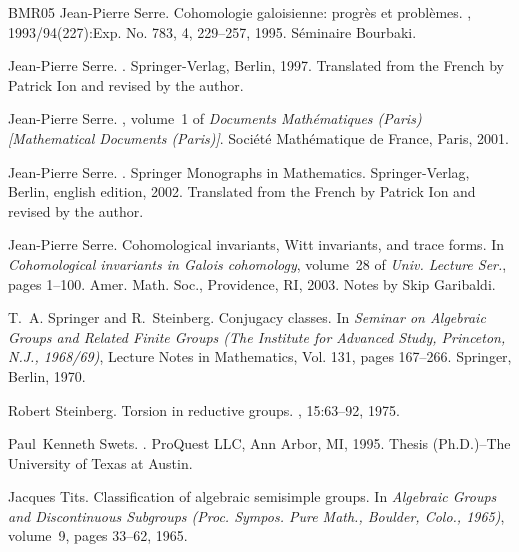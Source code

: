 \begin{thebibliography}{BMR05}
Jean-Pierre Serre.
\newblock Cohomologie galoisienne: progr\`es et probl\`emes.
, 1993/94(227):Exp. No. 783, 4, 229--257, 1995.
\newblock S\'{e}minaire Bourbaki.

Jean-Pierre Serre.
.
\newblock Springer-Verlag, Berlin, 1997.
\newblock Translated from the French by Patrick Ion and revised by the author.

Jean-Pierre Serre.
, volume~1 of {\em Documents Math\'{e}matiques (Paris) [Mathematical Documents (Paris)]}.
\newblock Soci{\'e}t{\'e} Math{\'e}matique de France, Paris, 2001.

Jean-Pierre Serre.
.
\newblock Springer Monographs in Mathematics. Springer-Verlag, Berlin, english edition, 2002.
\newblock Translated from the French by Patrick Ion and revised by the author.

Jean-Pierre Serre.
\newblock Cohomological invariants, {W}itt invariants, and trace forms.
\newblock In {\em Cohomological invariants in {G}alois cohomology}, volume~28 of {\em Univ. Lecture Ser.}, pages 1--100. Amer. Math. Soc., Providence, RI, 2003.
\newblock Notes by Skip Garibaldi.

T.~A. Springer and R.~Steinberg.
\newblock Conjugacy classes.
\newblock In {\em Seminar on {A}lgebraic {G}roups and {R}elated {F}inite {G}roups ({T}he {I}nstitute for {A}dvanced {S}tudy, {P}rinceton, {N}.{J}., 1968/69)}, Lecture Notes in Mathematics, Vol. 131, pages 167--266. Springer, Berlin, 1970.

Robert Steinberg.
\newblock Torsion in reductive groups.
, 15:63--92, 1975.

Paul~Kenneth Swets.
.
\newblock ProQuest LLC, Ann Arbor, MI, 1995.
\newblock Thesis (Ph.D.)--The University of Texas at Austin.

Jacques Tits.
\newblock Classification of algebraic semisimple groups.
\newblock In {\em Algebraic Groups and Discontinuous Subgroups (Proc. Sympos. Pure Math., Boulder, Colo., 1965)}, volume~9, pages 33--62, 1965.


\end{thebibliography}
